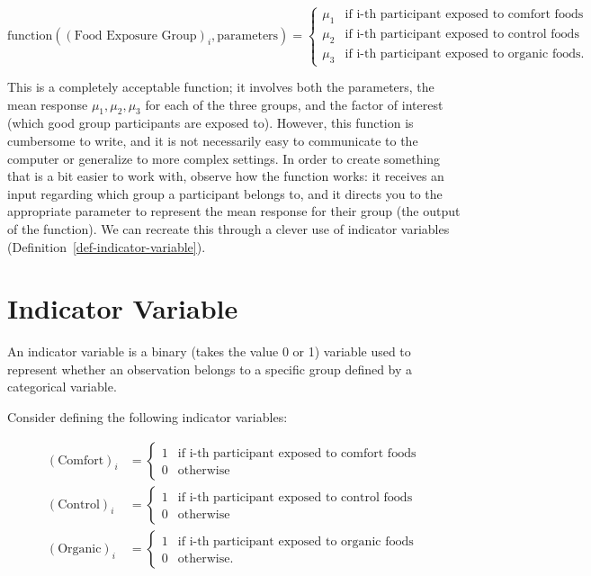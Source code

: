 \documentclass[
  letterpaper,
  DIV=11,
  numbers=noendperiod]{scrreprt}
\theoremstyle{plain}
\theoremstyle{definition}
\theoremstyle{definition}
\theoremstyle{remark}
\begin{document}
\[
\text{function}\left((\text{Food Exposure Group})_i, \text{parameters}\right) =
\begin{cases}
  \mu_1 & \text{if i-th participant exposed to comfort foods} \\
  \mu_2 & \text{if i-th participant exposed to control foods} \\
  \mu_3 & \text{if i-th participant exposed to organic foods.} 
\end{cases}
\]

This is a completely acceptable function; it involves both the
parameters, the mean response \(\mu_1, \mu_2, \mu_3\) for each of the
three groups, and the factor of interest (which good group participants
are exposed to). However, this function is cumbersome to write, and it
is not necessarily easy to communicate to the computer or generalize to
more complex settings. In order to create something that is a bit easier
to work with, observe how the function works: it receives an input
regarding which group a participant belongs to, and it directs you to
the appropriate parameter to represent the mean response for their group
(the output of the function). We can recreate this through a clever use
of indicator variables (Definition~\ref{def-indicator-variable}).

\hypertarget{indicator-variable-1}{%
\section{Indicator Variable}\label{indicator-variable-1}}

An indicator variable is a binary (takes the value 0 or 1) variable used
to represent whether an observation belongs to a specific group defined
by a categorical variable.

Consider defining the following indicator variables:

\[
\begin{aligned}
  (\text{Comfort})_i 
    &= \begin{cases} 1 & \text{if i-th participant exposed to comfort foods} \\ 0 & \text{otherwise} \end{cases} \\
  (\text{Control})_i 
    &= \begin{cases} 1 & \text{if i-th participant exposed to control foods} \\ 0 & \text{otherwise} \end{cases} \\
  (\text{Organic})_i 
    &= \begin{cases} 1 & \text{if i-th participant exposed to organic foods} \\ 0 & \text{otherwise}. \end{cases}
\end{aligned}
\]
\end{document}
